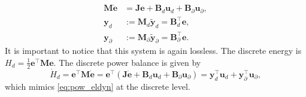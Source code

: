 \documentclass{svjour3}                     %
\begin{document}
	\begin{equation}
	\begin{aligned}
	\mathbf{M} \dot{\mathbf{e}} &= \mathbf{J} \mathbf{e} + \mathbf{B}_d \mathbf{u}_d + \mathbf{B}_\partial \mathbf{u}_\partial, \\
	\mathbf{y}_d &:= \mathbf{M}_d \widetilde{\mathbf{y}}_d = \mathbf{B}_d^\top \mathbf{e},  \\
	\mathbf{y}_\partial &:= \mathbf{M}_\partial \widetilde{\mathbf{y}}_\partial = \mathbf{B}_\partial^\top \mathbf{e}.
	\end{aligned}
	\end{equation}
	It is important to notice that this system is again lossless. The discrete energy is $H_d = \frac{1}{2} \mathbf{e}^\top \mathbf{M} \mathbf{e}$.
	The discrete power balance is given by
	\begin{equation*}
	\dot{H}_d = \mathbf{e}^\top \mathbf{M} \dot{\mathbf{e}} = \mathbf{e}^\top ( \mathbf{J} \dot{\mathbf{e}} + \mathbf{B}_d \mathbf{u}_d + \mathbf{B}_\partial \mathbf{u}_\partial) = \mathbf{y}_d^\top \mathbf{u}_d + \mathbf{y}_\partial^\top \mathbf{u}_\partial,
	\end{equation*}
	which mimics \eqref{eq:pow_eldyn} at the discrete level.
	
\end{document}
